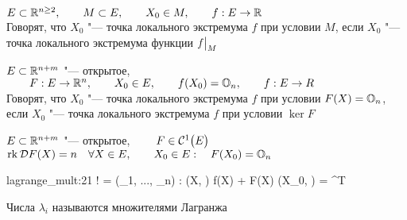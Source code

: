 \begin{definition}
	$ E \sub \R^{n \ge 2}, \qquad M \sub E, \qquad X_0 \in M, \qquad f : E \to \R $ \\
	Говорят, что $ X_0 $ "--- точка локального экстремума $ f $ при условии $ M $, если $ X_0 $ "--- точка локального экстремума функции $ f\clamp{M} $
\end{definition}

\begin{definition}
	$ E \sub \R^{n + m} $ "--- открытое, $ \qquad F : E \to \R^n, \qquad X_0 \in E, \qquad f(X_0) = \On, \qquad f : E \to R $ \\
	Говорят, что $ X_0 $ "--- точка локального экстремума $ f $ при условии $ F(X) = \On $, если $ X_0 $ "--- точка локального экстремума $ f $ при условии $ \ker F $
\end{definition}

\begin{theorem}
	$ E \sub \R^{n + m} $ "--- открытое, $ \qquad F \in \Cont[1]E $ \\
	$ \rk \mc{D}F(X) = n \quad \forall X \in E, \qquad X_0 \in E : \quad F(X_0) = \On $
	\begin{equ}{lagrange_mult:21}
		\implies \exist! \Lambda = (\lambda_1, ..., \lambda_n) : \quad {} \vphi(X, \Lambda)  f(X) + \Lambda F(X) \qquad \nabla \vphi(X_0, \Lambda) = \On[n + m]^T
	\end{equ}
\end{theorem}

\begin{remark}
	Числа $ \lambda_i $ называются множителями Лагранжа
\end{remark}

